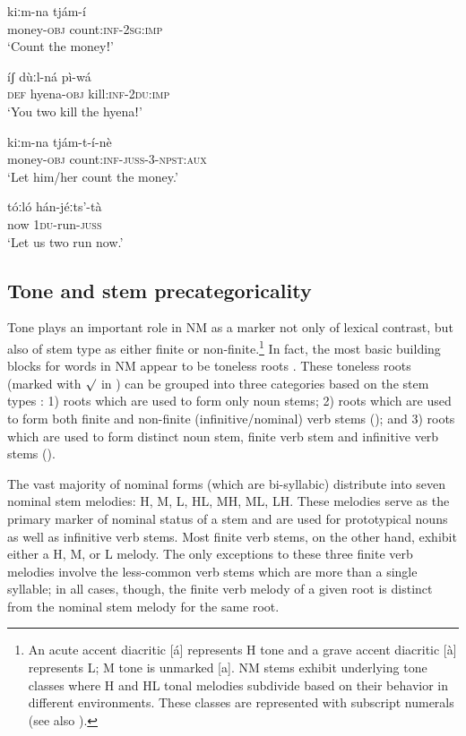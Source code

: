 \documentclass[output=paper]{langsci/langscibook}
\begin{document}
\ea\label{ex:mahland:12}
\gll kiːm-na       tj\'{a}m-\'{i}   \\
money\textsc{{}-obj}   count:\textsc{inf-2sg:imp}\\
\glt `Count the moneyǃ'
\z

\ea\label{ex:mahland:13}
\gll \'{i}ʃ     d\`{u}ːl-n\'{a}       p\`{i}-w\'{a} \\
\textsc{def}   hyena-\textsc{obj}   kill:\textsc{inf-2du:imp}\\
\glt `You two kill the hyenaǃ'
\z

\ea\label{ex:mahland:14}
\gll kiːm-na        tj\'{a}m-t-\'{i}-n\`{e}\\
money-\textsc{obj}   count:\textsc{inf-juss-3-npst:aux}\\
\glt `Let him/her count the money.'
\z

\ea\label{ex:mahland:15}
\gll t\'{o}ːl\'{o}    h\'{a}n-j\'{e}ːts'-t\`{a}  \\
now    \textsc{1du}{}-run\textsc{{}-juss}\\
\glt `Let us two run now.' 

\subsection{Tone and stem precategoricality}\label{sec:mahland:1.3}

Tone plays an important role in NM as a marker not only of lexical contrast, but also of stem type as either finite or non-finite.\footnote{An acute accent diacritic [\'{a}] represents H tone and a grave accent diacritic [\`{a}] represents L; M tone is unmarked [a]. NM stems exhibit underlying tone classes where H and HL tonal melodies subdivide based on their behavior in different environments. These classes are represented with subscript numerals (see also \citealt[146]{Ahland2012}).} In fact, the most basic building blocks for words in NM appear to be toneless roots \citet[182]{Ahland2012}. These toneless roots (marked with ${\surd}$ in ) can be grouped into three categories based on the stem types \citep{Ahland2014a}: 1) roots which are used to form only noun stems; 2) roots which are used to form both finite and non-finite (infinitive/nominal) verb stems (); and 3) roots which are used to form distinct noun stem, finite verb stem and infinitive verb stems (). 

The vast majority of nominal forms (which are bi-syllabic) distribute into seven nominal stem melodies: H, M, L, HL, MH, ML, LH. These melodies serve as the primary marker of nominal status of a stem and are used for prototypical nouns as well as infinitive verb stems. Most finite verb stems, on the other hand, exhibit either a H, M, or L melody. The only exceptions to these three finite verb melodies involve the less-common verb stems which are more than a single syllable; in all cases, though, the finite verb melody of a given root is distinct from the nominal stem melody for the same root. 
\end{document}
